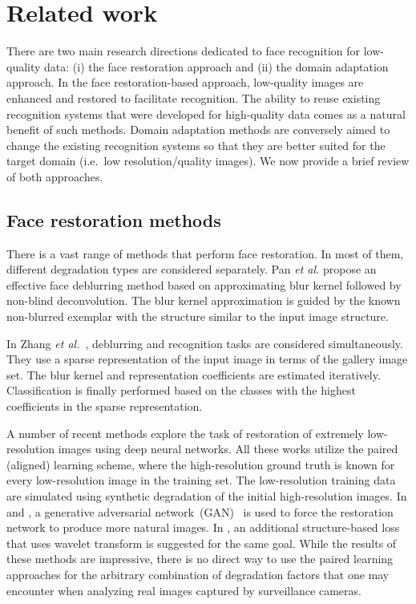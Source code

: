 \section{Related work}
\label{sect:related}

There are two main research directions dedicated to face recognition for low-quality data: (i) the face restoration approach and (ii) the domain adaptation approach. In the face restoration-based approach, low-quality images are enhanced and restored to facilitate recognition. The ability to reuse existing recognition systems that were developed for high-quality data comes as a natural benefit of such methods. Domain adaptation methods are conversely aimed to change the existing recognition systems so that they are better suited for the target domain (i.e.\ low resolution/quality images). We now provide a brief review of both approaches.

\subsection{Face restoration methods}

There is a vast range of methods that perform face restoration. In most of them, different degradation types are considered separately. Pan \textit{et al.} \cite{pan2014deblurring} propose an effective face deblurring method based on approximating blur kernel followed by non-blind deconvolution. The blur kernel  approximation is guided by the known non-blurred exemplar with the structure similar to the input image structure. 

In Zhang \textit{et al.}~\cite{ZhangYZNH11}, deblurring and recognition tasks are considered simultaneously. They use a sparse representation of the input image in terms of the gallery image set. The blur kernel and representation coefficients are estimated iteratively. Classification is finally performed based on the classes with the highest coefficients in the sparse representation.  


A number of recent methods \cite{TuzelTH16,ZhuLLT16,xu2017learning,huang2017wavelet} explore the task of restoration of extremely low-resolution images using deep neural networks. All these works utilize the paired (aligned) learning scheme, where the high-resolution ground truth is known for every low-resolution image in the training set. The low-resolution training data are simulated using synthetic degradation of the initial high-resolution images. In \cite{xu2017learning} and \cite{TuzelTH16}, a generative adversarial network~(GAN)~\cite{goodfellow2014generative} is used to force the restoration network to produce more natural images. In \cite{huang2017wavelet}, an additional structure-based loss that uses wavelet transform is suggested for the same goal. While the results of these methods are impressive, there is no direct way to use the paired learning approaches for the arbitrary combination of degradation factors that one may encounter when analyzing real images captured by surveillance cameras. 

